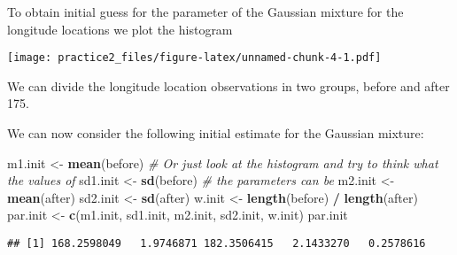 \documentclass[
]{article}
\newenvironment{Shaded}{\begin{snugshade}}{\end{snugshade}}
\newcommand{\CommentTok}[1]{\textcolor[rgb]{0.56,0.35,0.01}{\textit{#1}}}
\newcommand{\DataTypeTok}[1]{\textcolor[rgb]{0.13,0.29,0.53}{#1}}
\newcommand{\DecValTok}[1]{\textcolor[rgb]{0.00,0.00,0.81}{#1}}
\newcommand{\KeywordTok}[1]{\textcolor[rgb]{0.13,0.29,0.53}{\textbf{#1}}}
\newcommand{\NormalTok}[1]{#1}
\newcommand{\OperatorTok}[1]{\textcolor[rgb]{0.81,0.36,0.00}{\textbf{#1}}}
\newcommand{\OtherTok}[1]{\textcolor[rgb]{0.56,0.35,0.01}{#1}}
\newcommand{\StringTok}[1]{\textcolor[rgb]{0.31,0.60,0.02}{#1}}
\begin{document}
To obtain initial guess for the parameter of the Gaussian mixture for
the longitude locations we plot the histogram

\begin{Shaded}
\end{Shaded}

\texttt{[image: practice2\_files/figure-latex/unnamed-chunk-4-1.pdf]}

We can divide the longitude location observations in two groups, before
and after 175.

\begin{Shaded}
\end{Shaded}

We can now consider the following initial estimate for the Gaussian
mixture:

\begin{Shaded}
\begin{Highlighting}[]
\NormalTok{m1.init <-}\StringTok{ }\KeywordTok{mean}\NormalTok{(before)        }\CommentTok{# Or just look at the histogram and try to think what the values of}
\NormalTok{sd1.init <-}\StringTok{ }\KeywordTok{sd}\NormalTok{(before)         }\CommentTok{# the parameters can be}
\NormalTok{m2.init <-}\StringTok{ }\KeywordTok{mean}\NormalTok{(after)}
\NormalTok{sd2.init <-}\StringTok{ }\KeywordTok{sd}\NormalTok{(after)}
\NormalTok{w.init <-}\StringTok{ }\KeywordTok{length}\NormalTok{(before) }\OperatorTok{/}\StringTok{ }\KeywordTok{length}\NormalTok{(after)}
\NormalTok{par.init <-}\StringTok{ }\KeywordTok{c}\NormalTok{(m1.init, sd1.init, m2.init, sd2.init, w.init)}
\NormalTok{par.init}
\end{Highlighting}
\end{Shaded}

\begin{verbatim}
## [1] 168.2598049   1.9746871 182.3506415   2.1433270   0.2578616
\end{verbatim}
\end{document}
